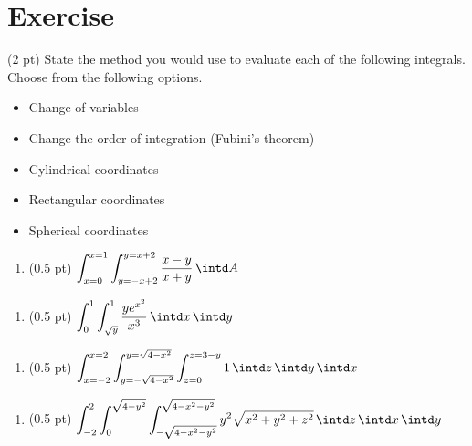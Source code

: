 \section{Exercise}

(2 pt) State the method you would use to evaluate each of the following integrals. Choose from the following options.
\begin{itemize}
\item Change of variables
\item Change the order of integration (Fubini's theorem)
\item Cylindrical coordinates
\item Rectangular coordinates
\item Spherical coordinates
\end{itemize}
\begin{enumerate}[label=(\alph*)]
\item (0.5 pt) $\displaystyle\int_{x = 0}^{x = 1} \int_{y = -x + 2}^{y = x + 2} \frac{x - y}{x + y} \, \intd A$
\end{enumerate}

\spaceSolution{1in}{%
}%



\begin{enumerate}[resume,label=(\alph*)]
\item (0.5 pt) $\displaystyle\int_{0}^{1} \int_{\sqrt{y}}^{1} \frac{y e^{x^{2}}}{x^{3}} \, \intd x \, \intd y$
\end{enumerate}

\spaceSolution{1in}{%
}%



\begin{enumerate}[resume,label=(\alph*)]
\item (0.5 pt) $\displaystyle\int_{x = -2}^{x = 2} \int_{y = -\sqrt{4 - x^{2}}}^{y = \sqrt{4 - x^{2}}} \int_{z = 0}^{z = 3 - y} 1 \, \intd z \, \intd y \, \intd x$
\end{enumerate}

\spaceSolution{1in}{%
}%



\begin{enumerate}[resume,label=(\alph*)]
\item (0.5 pt) $\displaystyle\int_{-2}^{2} \int_{0}^{\sqrt{4 - y^{2}}} \int_{-\sqrt{4 - x^{2} - y^{2}}}^{\sqrt{4 - x^{2} - y^{2}}} y^{2} \sqrt{x^{2} + y^{2} + z^{2}} \, \intd z \, \intd x \, \intd y$
\end{enumerate}

\spaceSolution{1in}{%
}%